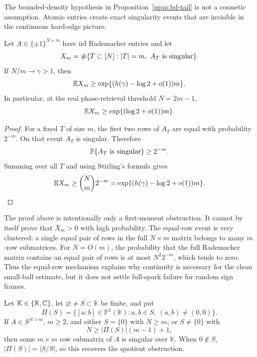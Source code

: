 The bounded-density hypothesis in Proposition~\ref{prop:bd-tail} is not a
cosmetic assumption.  Atomic entries create exact singularity events that are
invisible in the continuous hard-edge picture.

\begin{proposition}\label{prop:atomic-firstmoment}
Let \(A\in\{\pm1\}^{N\times m}\) have iid Rademacher entries and let
\[
  X_m=\#\{T\subset[N]: |T|=m,\ A_T\hbox{ is singular}\}.
\]
If \(N/m\to\gamma>1\), then
\[
  \mathbb{E} X_m\ge
  \exp\{(h(\gamma)-\log2+o(1))m\}.
\]
In particular, at the real phase-retrieval threshold \(N=2m-1\),
\[
  \mathbb{E} X_m\ge \exp\{(\log2+o(1))m\}.
\]
\end{proposition}

\begin{proof}
For a fixed \(T\) of size \(m\), the first two rows of \(A_T\) are equal with
probability \(2^{-m}\).  On that event \(A_T\) is singular.  Therefore
\[
  \mathbb{P}\{A_T\hbox{ is singular}\}\ge 2^{-m}.
\]
Summing over all \(T\) and using Stirling's formula gives
\[
  \mathbb{E} X_m\ge \binom{N}{m}2^{-m}
  =\exp\{(h(\gamma)-\log2+o(1))m\}.
\]
\end{proof}

\begin{remark}
The proof above is intentionally only a first-moment obstruction.  It cannot by
itself prove that \(X_m>0\) with high probability.  The equal-row event is very
clustered: a single equal pair of rows in the full \(N\times m\) matrix belongs
to many \(m\)-row submatrices.  For \(N=O(m)\), the probability that the full
Rademacher matrix contains an equal pair of rows is at most \(N^2 2^{-m}\),
which tends to zero.  Thus the equal-row mechanism explains why continuity is
necessary for the clean small-ball estimate, but it does not settle full-spark
failure for random sign frames.
\end{remark}

\begin{proposition}\label{prop:finite-alphabet-obstruction}
Let \(\mathbb K\in\{\mathbb{R},\mathbb{C}\}\), let \(\varnothing\ne S\subset\mathbb K\) be
finite, and put
\[
  \Pi(S)=
  \{[a:b]\in\mathbb P^1(\mathbb K): a,b\in S,\ (a,b)\ne(0,0)\}.
\]
If \(A\in S^{N\times m}\), \(m\ge2\), and either \(S=\{0\}\) with \(N\ge m\),
or \(S\ne\{0\}\) with
\[
  N\ge |\Pi(S)|(m-1)+1,
\]
then some \(m\times m\) row submatrix of \(A\) is singular over \(\mathbb K\).
When \(0\notin S\), \(|\Pi(S)|=|S/S|\), so this recovers the quotient
obstruction.
\end{proposition}

